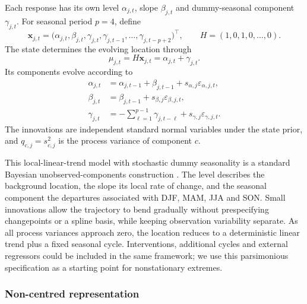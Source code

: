 \documentclass[11pt,a4paper]{article}
\begin{document}
	Each response has its own level \(\alpha_{j,t}\), slope \(\beta_{j,t}\)
	and dummy-seasonal component \(\gamma_{j,t}\). For seasonal period \(p=4\),
	define
	\begin{equation}\label{eq:state-vector}
		\bm x_{j,t}
		=
		\bigl(
		\alpha_{j,t},\beta_{j,t},
		\gamma_{j,t},\gamma_{j,t-1},\ldots,
		\gamma_{j,t-p+2}
		\bigr)^\top,
		\qquad
		H=(1,0,1,0,\ldots,0).
	\end{equation}
	The state determines the evolving location through
	\begin{equation}\label{eq:location}
		\mu_{j,t}=H\bm x_{j,t}=\alpha_{j,t}+\gamma_{j,t}.
	\end{equation}
	Its components evolve according to
	\begin{subequations}\label{eq:state-transition}
		\begin{align}
			\alpha_{j,t}
			&=\alpha_{j,t-1}+\beta_{j,t-1}
			+s_{\alpha,j}\varepsilon_{\alpha,j,t},
			\label{eq:level}\\
			\beta_{j,t}
			&=\beta_{j,t-1}
			+s_{\beta,j}\varepsilon_{\beta,j,t},
			\label{eq:slope}\\
			\gamma_{j,t}
			&=-\sum_{\ell=1}^{p-1}\gamma_{j,t-\ell}
			+s_{\gamma,j}\varepsilon_{\gamma,j,t}.
			\label{eq:season}
		\end{align}
	\end{subequations}
	The innovations are independent standard normal variables under the state
	prior, and \(q_{c,j}=s_{c,j}^2\) is the process variance of component \(c\).
	
	This local-linear-trend model with stochastic dummy seasonality is a
	standard Bayesian unobserved-components construction
	\citep{harvey1990,west2006,petris2009,scott2014}. The level describes the
	background location, the slope its local rate of change, and the seasonal
	component the departures associated with DJF, MAM, JJA and SON. Small
	innovations allow the trajectory to bend gradually without prespecifying
	changepoints or a spline basis, while keeping observation variability
	separate. As all process variances approach zero, the location reduces to a
	deterministic linear trend plus a fixed seasonal cycle. Interventions,
	additional cycles and external regressors could be included in the same
	framework; we use this parsimonious specification as a starting point for
	nonstationary extremes.
	
	\subsubsection{Non-centred representation}
	\label{subsec::non-centred_representation}
	
\end{document}
